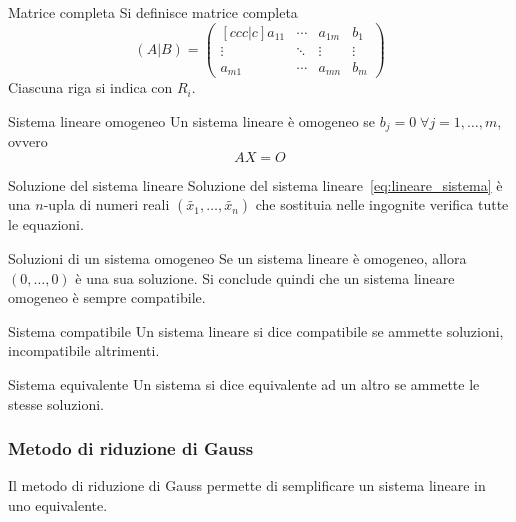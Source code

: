 \begin{Def}{Matrice completa}
  Si definisce matrice completa
  \begin{equation*}
    (A\vert B)=
    \begin{pmatrix}[ccc|c]
      a_{11} & \cdots & a_{1m} & b_1\\
      \vdots & \ddots & \vdots & \vdots\\
      a_{m1} & \cdots & a_{mn} & b_m
    \end{pmatrix}
  \end{equation*}
  Ciascuna riga si indica con $R_i$.
\end{Def}

\begin{Def}{Sistema lineare omogeneo}
  Un sistema lineare è omogeneo se $b_j=0\;\forall j=1,\ldots,m$, ovvero
  \begin{equation*}
    AX=O
  \end{equation*}
\end{Def}

\begin{Def}{Soluzione del sistema lineare}
  Soluzione del sistema lineare~\eqref{eq:lineare_sistema} è una $n$-upla di numeri
  reali $(\widetilde{x_1},\ldots,\widetilde{x_n})$ che sostituia nelle ingognite
  verifica tutte le equazioni.
\end{Def}

\begin{SubDef}{Soluzioni di un sistema omogeneo}
  Se un sistema lineare è omogeneo, allora $(0,\ldots,0)$ è una sua soluzione. Si
  conclude quindi che un sistema lineare omogeneo è sempre compatibile.
\end{SubDef}

\begin{Def}{Sistema compatibile}
  Un sistema lineare si dice compatibile se ammette soluzioni, incompatibile altrimenti.
\end{Def}

\begin{Def}{Sistema equivalente}
  Un sistema si dice equivalente ad un altro se ammette le stesse soluzioni.
\end{Def}

\subsubsection{Metodo di riduzione di Gauss}%
\label{ssub:metodo_di_riduzione_di_gauss}

Il metodo di riduzione di Gauss permette di semplificare un sistema lineare in uno
equivalente.

